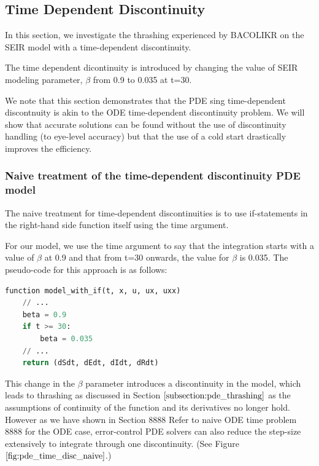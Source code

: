 \documentclass{article}
\begin{document}
\subsection{Time Dependent Discontinuity}
\label{subsection:pde_time_intro}
In this section, we investigate the thrashing experienced by BACOLIKR on the SEIR model with a time-dependent discontinuity. 

The time dependent dicontinuity is introduced by changing the value of SEIR modeling parameter, $\beta$ from 0.9 to 0.035 at t=30.

We note that this section demonstrates that the PDE sing time-dependent discontnuity is akin to the ODE time-dependent discontinuity problem. We will show that accurate solutions can be found without the use of discontinuity handling (to eye-level accuracy) but that the use of a cold start drastically improves the efficiency.

\subsubsection{Naive treatment of the time-dependent discontinuity PDE model}
\label{subsubsection:pde_time_naive}
The naive treatment for time-dependent discontinuities is to use if-statements in the right-hand side function itself using the time argument.

For our model, we use the time argument to say that the integration starts with a value of $\beta$ at 0.9 and that from t=30 onwards, the value for $\beta$ is 0.035. The pseudo-code for this approach is as follows:

\begin{minipage}{\linewidth}
\begin{lstlisting}[language=Python]
function model_with_if(t, x, u, ux, uxx)
    // ...
    beta = 0.9
    if t >= 30:
        beta = 0.035
    // ...
    return (dSdt, dEdt, dIdt, dRdt)

\end{lstlisting}
\end{minipage}

This change in the $\beta$ parameter introduces a discontinuity in the model, which leads to thrashing as discussed in Section $\ref{subsection:pde_thrashing}$ as the assumptions of continuity of the function and its derivatives no longer hold. However as we have shown in Section 8888 Refer to naive ODE time problem 8888 for the ODE case, error-control PDE solvers can also reduce the step-size extensively to integrate through one discontinuity. (See Figure $\ref{fig:pde_time_disc_naive}$.)
\end{document}
